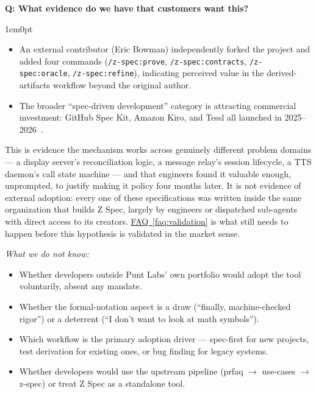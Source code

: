 \documentclass[11pt,letterpaper]{article}
\newcounter{faqnum}
\newenvironment{faqpair}[1]{%
  \needspace{4\baselineskip}%
  \vspace{0.5em}%
  \refstepcounter{faqnum}%
  \noindent\textbf{\color{SectionBlue}Q\thefaqnum: #1}\par\nopagebreak[4]%
  \vspace{0.2em}%
  \begin{adjustwidth}{1em}{0pt}%
  \setlength{\parindent}{0pt}%
}{%
  \end{adjustwidth}%
  \vspace{0.5em}%
}
\newcommand{\faqref}[1]{\hyperref[#1]{FAQ~\ref*{#1}}}
\begin{document}
\begin{faqpair}{What evidence do we have that customers want this?}
\begin{itemize}[nosep]
\item An external contributor (Eric Bowman) independently forked the project and added four commands (\texttt{/z-spec:prove}, \texttt{/z-spec:contracts}, \texttt{/z-spec:oracle}, \texttt{/z-spec:refine}), indicating perceived value in the derived-artifacts workflow beyond the original author.
\item The broader ``spec-driven development'' category is attracting commercial investment: GitHub Spec Kit, Amazon Kiro, and Tessl all launched in 2025--2026~\cite{abebe2026sdd}.
\end{itemize}

This is evidence the mechanism works across genuinely different problem domains --- a display server's reconciliation logic, a message relay's session lifecycle, a TTS daemon's call state machine --- and that engineers found it valuable enough, unprompted, to justify making it policy four months later. It is not evidence of external adoption: every one of these specifications was written inside the same organization that builds Z Spec, largely by engineers or dispatched sub-agents with direct access to its creators. \faqref{faq:validation} is what still needs to happen before this hypothesis is validated in the market sense.

\emph{What we do not know:}
\begin{itemize}[nosep]
\item Whether developers outside Punt Labs' own portfolio would adopt the tool voluntarily, absent any mandate.
\item Whether the formal-notation aspect is a draw (``finally, machine-checked rigor'') or a deterrent (``I don't want to look at math symbols'').
\item Which workflow is the primary adoption driver --- spec-first for new projects, test derivation for existing ones, or bug finding for legacy systems.
\item Whether developers would use the upstream pipeline (prfaq $\to$ use-cases $\to$ z-spec) or treat Z Spec as a standalone tool.
\end{itemize}
\end{faqpair}
\end{document}
